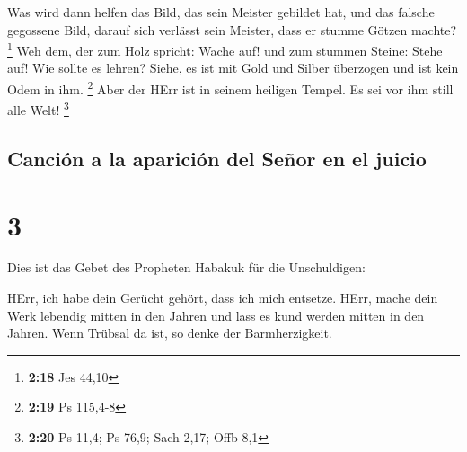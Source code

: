  Was wird dann helfen das Bild, das sein Meister gebildet
hat, und das falsche gegossene Bild, darauf sich verlässt sein Meister,
dass er stumme Götzen machte? \footnote{\textbf{2:18} Jes 44,10}
 Weh dem, der zum Holz spricht: Wache auf! und zum
stummen Steine: Stehe auf! Wie sollte es lehren? Siehe, es ist mit Gold
und Silber überzogen und ist kein Odem in ihm. \footnote{\textbf{2:19}
  Ps 115,4-8}  Aber der HErr ist in seinem heiligen
Tempel. Es sei vor ihm still alle Welt! \footnote{\textbf{2:20} Ps 11,4;
  Ps 76,9; Sach 2,17; Offb 8,1}

\hypertarget{canciuxf3n-a-la-apariciuxf3n-del-seuxf1or-en-el-juicio}{%
\subsection{Canción a la aparición del Señor en el
juicio}\label{canciuxf3n-a-la-apariciuxf3n-del-seuxf1or-en-el-juicio}}

\hypertarget{section-2}{%
\section{3}\label{section-2}}

 Dies ist das Gebet des Propheten Habakuk für die
Unschuldigen:

 HErr, ich habe dein Gerücht gehört, dass ich mich
entsetze. HErr, mache dein Werk lebendig mitten in den Jahren und lass
es kund werden mitten in den Jahren. Wenn Trübsal da ist, so denke der
Barmherzigkeit.

